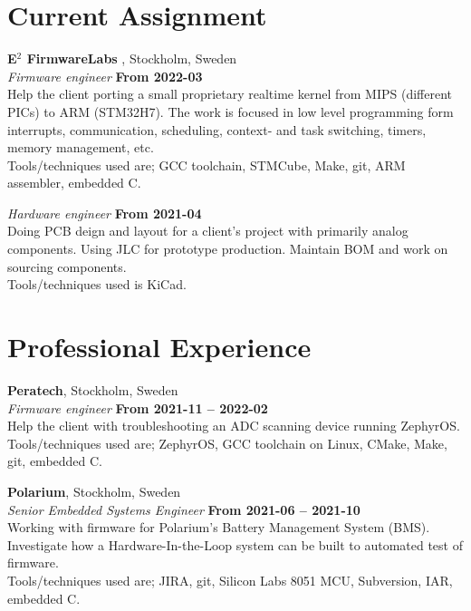 \documentclass[a4paper,margin,line]{res} \usepackage{latexsym}
\begin{document}
\begin{resume}


\section{\sc Current Assignment}

{\bf E$^2$ FirmwareLabs }, Stockholm, Sweden\\

\vspace{-5mm}
{\em Firmware engineer} \hfill {\bf From 2022-03}\\
Help the client porting a small proprietary realtime kernel from 
MIPS (different PICs) to ARM (STM32H7). The work is focused in low 
level programming form interrupts, communication, scheduling, context-
and task switching, timers, memory management, etc.
\\ Tools/techniques used are; GCC toolchain, STMCube, Make, git, 
ARM assembler, embedded C.

{\em Hardware engineer} \hfill {\bf From 2021-04}\\
Doing PCB deign and layout for a client's project with primarily
analog components. Using JLC for prototype production. Maintain BOM
and work on sourcing components. \\ Tools/techniques used is KiCad.

\vspace{3mm}

\section{\sc Professional Experience}
{\bf Peratech}, Stockholm, Sweden\\
{\em Firmware engineer} \hfill {\bf From 2021-11 -- 2022-02}\\
Help the client with troubleshooting an ADC scanning device running
ZephyrOS.  \\ Tools/techniques used are; ZephyrOS, GCC toolchain on
Linux, CMake, Make, git, embedded C.


{\bf Polarium}, Stockholm, Sweden\\
{\em Senior Embedded Systems Engineer} \hfill {\bf From 2021-06 -- 2021-10}\\
Working with firmware for Polarium's Battery Management System (BMS).
Investigate how a Hardware-In-the-Loop system can be built to automated
test of firmware. \\ Tools/techniques used are; JIRA, git, Silicon Labs 8051
MCU, Subversion, IAR, embedded C.



\end{resume}
\end{document}
